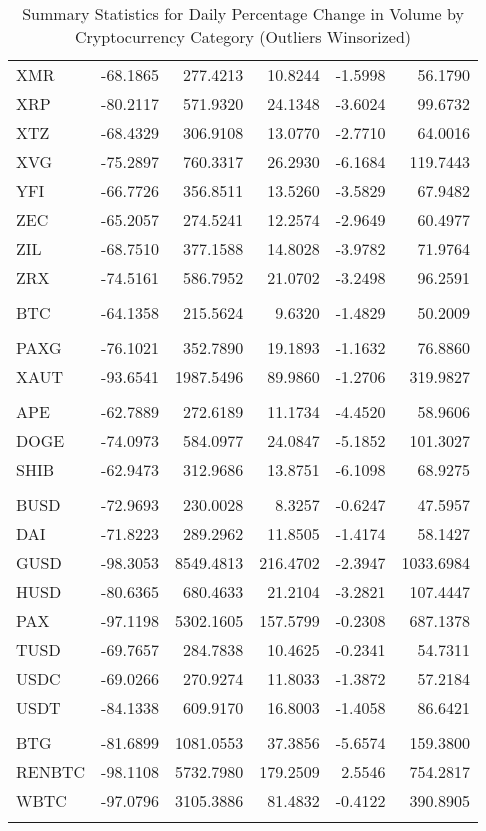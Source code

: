 \begin{table}[ht]
\begin{tabular}{lrrrrr}
XMR & -68.1865 & 277.4213 & 10.8244 & -1.5998 & 56.1790 \\
XRP & -80.2117 & 571.9320 & 24.1348 & -3.6024 & 99.6732 \\
XTZ & -68.4329 & 306.9108 & 13.0770 & -2.7710 & 64.0016 \\
XVG & -75.2897 & 760.3317 & 26.2930 & -6.1684 & 119.7443 \\
YFI & -66.7726 & 356.8511 & 13.5260 & -3.5829 & 67.9482 \\
ZEC & -65.2057 & 274.5241 & 12.2574 & -2.9649 & 60.4977 \\
ZIL & -68.7510 & 377.1588 & 14.8028 & -3.9782 & 71.9764 \\
ZRX & -74.5161 & 586.7952 & 21.0702 & -3.2498 & 96.2591 \\
\addlinespace
\multicolumn{6}{l}{\textbf{Bitcoin}} \\
BTC & -64.1358 & 215.5624 & 9.6320 & -1.4829 & 50.2009 \\
\addlinespace
\multicolumn{6}{l}{\textbf{Gold Pegged}} \\
PAXG & -76.1021 & 352.7890 & 19.1893 & -1.1632 & 76.8860 \\
XAUT & -93.6541 & 1987.5496 & 89.9860 & -1.2706 & 319.9827 \\
\addlinespace
\multicolumn{6}{l}{\textbf{Meme Coins}} \\
APE & -62.7889 & 272.6189 & 11.1734 & -4.4520 & 58.9606 \\
DOGE & -74.0973 & 584.0977 & 24.0847 & -5.1852 & 101.3027 \\
SHIB & -62.9473 & 312.9686 & 13.8751 & -6.1098 & 68.9275 \\
\addlinespace
\multicolumn{6}{l}{\textbf{Stablecoins}} \\
BUSD & -72.9693 & 230.0028 & 8.3257 & -0.6247 & 47.5957 \\
DAI & -71.8223 & 289.2962 & 11.8505 & -1.4174 & 58.1427 \\
GUSD & -98.3053 & 8549.4813 & 216.4702 & -2.3947 & 1033.6984 \\
HUSD & -80.6365 & 680.4633 & 21.2104 & -3.2821 & 107.4447 \\
PAX & -97.1198 & 5302.1605 & 157.5799 & -0.2308 & 687.1378 \\
TUSD & -69.7657 & 284.7838 & 10.4625 & -0.2341 & 54.7311 \\
USDC & -69.0266 & 270.9274 & 11.8033 & -1.3872 & 57.2184 \\
USDT & -84.1338 & 609.9170 & 16.8003 & -1.4058 & 86.6421 \\
\addlinespace
\multicolumn{6}{l}{\textbf{Uncategorized}} \\
BTG & -81.6899 & 1081.0553 & 37.3856 & -5.6574 & 159.3800 \\
RENBTC & -98.1108 & 5732.7980 & 179.2509 & 2.5546 & 754.2817 \\
WBTC & -97.0796 & 3105.3886 & 81.4832 & -0.4122 & 390.8905 \\
\addlinespace
\bottomrule
\end{tabular}
\caption{Summary Statistics for Daily Percentage Change in Volume by Cryptocurrency Category (Outliers Winsorized)}
\label{tab:crypto_volume_change_summary}
\end{table}
